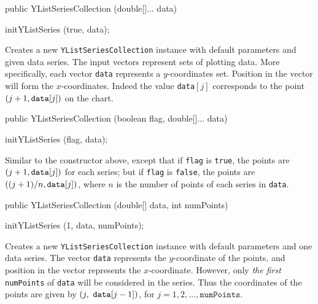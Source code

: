 \begin{code}

   public YListSeriesCollection (double[]... data) \begin{hide} {
      initYListSeries (true, data);
   }\end{hide}
\end{code}
\begin{tabb}
   Creates a new \texttt{YListSeriesCollection} instance with default
   parameters and given data series. The input vectors represent sets of
   plotting data. More specifically, each vector \texttt{data} represents
   a $y$-coordinates set.
   Position in the vector will form the $x$-coordinates. Indeed the value
   \texttt{data}$[j]$ corresponds to the point
   $(j+1, \mbox{\texttt{data}}[j])$ on the chart.
\end{tabb}
\begin{htmlonly}
\end{htmlonly}
\begin{code}

   public YListSeriesCollection (boolean flag, double[]... data) \begin{hide} {
      initYListSeries (flag, data);
   }\end{hide}
\end{code}
\begin{tabb}
  Similar to the constructor %
  above, except that if \texttt{flag} is \texttt{true}, the points are
 $(j+1, \mbox{\texttt{data}}[j])$ for each series;
  but if \texttt{flag} is \texttt{false},
  the points are $((j+1)/n, \mbox{\texttt{data}}[j])$, where $n$ is
  the number of points of each series in \texttt{data}.
\end{tabb}
\begin{htmlonly}
\end{htmlonly}
\begin{code}

   public YListSeriesCollection (double[] data, int numPoints) \begin{hide} {
      initYListSeries (1, data, numPoints);
   }\end{hide}
\end{code}
\begin{tabb}
   Creates a new \texttt{YListSeriesCollection} instance with default
   parameters and one data series.
   The vector \texttt{data} represents the $y$-coordinate of the points,
   and position in the vector represents the $x$-coordinate.
  However, only \emph{the first} \texttt{numPoints} of \texttt{data} will
  be considered in the series.
  Thus the coordinates of the points are given by
   $(j,\ \mbox{\texttt{data}}[j-1])$,
    for $j=1,2,\ldots, \texttt{numPoints}$.
\end{tabb}
